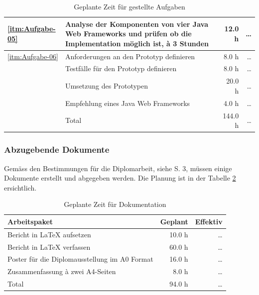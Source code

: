 \begin{table}[!h]
\begin{center}
\begin{tabular}{lp{7cm}rr}
        \midrule
        \ref{itm:Aufgabe-05} &
        Analyse der Komponenten von vier Java Web Frameworks und prüfen ob die
        Implementation möglich ist, à 3 Stunden &
        12.0 h &
        \ldots\\
        
        \midrule
        \ref{itm:Aufgabe-06} &
        Anforderungen an den Prototyp definieren &
        8.0 h &
        \ldots\\
        &
        Testfälle für den Prototyp definieren &
        8.0 h &
        \ldots\\
        &
        Umsetzung des Prototypen &
        20.0 h &
        \ldots\\
        &
        Empfehlung eines Java Web Frameworks &
        4.0 h &
        \ldots\\
        \bottomrule
        &
        Total &
        144.0 h &
        \ldots\\
        \bottomrule
      \end{tabular}
      \caption{Geplante Zeit für gestellte Aufgaben}
      \label{tab:aufgabenPlaning}
    \end{center}
  \end{table}
  
  \newpage
  
  \subsubsection{Abzugebende Dokumente}
  
  Gemäss den Bestimmungen für die Diplomarbeit, siehe \cite{hsz_reglement} S. 3,
  müssen einige Dokumente erstellt und abgegeben werden. Die Planung ist in der
  Tabelle \ref{tab:documentationPlaning} ersichtlich.
  \newline
  
  \begin{table}[ht]
    \sffamily 
    \begin{center}
      \begin{tabular}{p{9cm}rr}
        \toprule
        Arbeitspaket & Geplant & Effektiv \\
        \midrule
        Bericht in \LaTeX{} aufsetzen &
        10.0 h &
        \ldots\\
        Bericht in \LaTeX{} verfassen &
        60.0 h &
        \ldots\\
        Poster für die Diplomausstellung im A0 Format &
        16.0 h &
        \ldots\\
        Zusammenfassung à zwei A4-Seiten &
        8.0 h &
        \ldots\\
        \bottomrule
        Total &
        94.0 h &
        \ldots\\
        \bottomrule
      \end{tabular}
      \caption{Geplante Zeit für Dokumentation}
      \label{tab:documentationPlaning}
    \end{center}
  \end{table}
  
